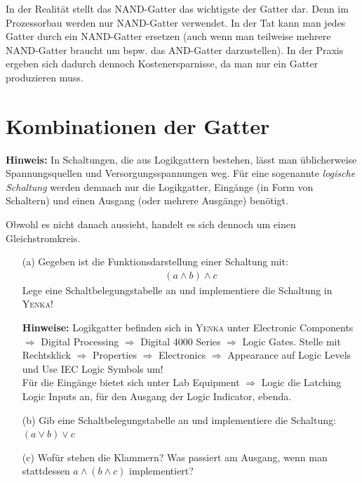 


In der Realität stellt das NAND-Gatter das wichtigste der Gatter dar.
Denn im Prozessorbau werden nur NAND-Gatter verwendet.
In der Tat kann man jedes Gatter durch ein NAND-Gatter ersetzen (auch wenn man teilweise mehrere NAND-Gatter braucht um bspw. das AND-Gatter darzustellen).
In der Praxis ergeben sich dadurch dennoch Kostenersparnisse, da man nur ein Gatter produzieren muss.



\section{Kombinationen der Gatter}

\textbf{Hinweis:} In Schaltungen, die aus Logikgattern bestehen, lässt man üblicherweise Spannungsquellen und Versorgungsspannungen weg. Für eine sogenannte \emph{logische Schaltung} werden demnach nur die Logikgatter, Eingänge (in Form von Schaltern) und einen Ausgang (oder mehrere Ausgänge) benötigt.

Obwohl es nicht danach aussieht, handelt es sich dennoch um einen Gleichstromkreis.

\begin{Aufgabe}
\hfill \par \vspace*{-.8cm}
\begin{itemize}
\item[(a)]
Gegeben ist die Funktionsdarstellung einer Schaltung mit:
\begin{align*}
(a \wedge b) \wedge c
\end{align*}
Lege eine Schaltbelegungstabelle an und implementiere die Schaltung in \textsc{Yenka}!

\textbf{Hinweise:} Logikgatter befinden sich in \textsc{Yenka} unter Electronic Components $\Rightarrow$ Digital Processing $\Rightarrow$ Digital 4000 Series $\Rightarrow$ Logic Gates. Stelle mit Rechtsklick $\Rightarrow$ Properties $\Rightarrow$ Electronics $\Rightarrow$ Appearance auf Logic Levels und Use IEC Logic Symbols um! \\
Für die Eingänge bietet sich unter Lab Equipment $\Rightarrow$ Logic die Latching Logic Inputs an, für den Ausgang der Logic Indicator, ebenda.
\item[(b)] Gib eine Schaltbelegungstabelle an und implementiere die Schaltung: $(a \vee b) \vee c$
\item[(c)] Wofür stehen die Klammern? Was passiert am Ausgang, wenn man stattdessen $a \wedge (b \wedge c)$ implementiert?
\end{itemize}
\end{Aufgabe}


